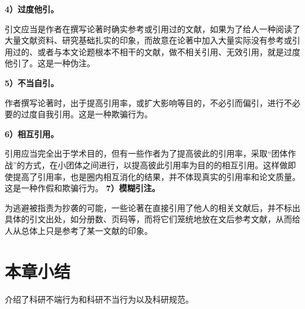 \textbf{4）过度他引。}

引文应当是作者在撰写论著时确实参考或引用过的文献，如果为了给人一种阅读了大量文献资料、研究基础扎实的印象，而故意在论著中加入大量实际没有参考或引用过的、或者与本文论题根本不相干的文献，做不相关引用、无效引用，就是过度他引了。这是一种伪注。

\textbf{5）不当自引。}

作者撰写论著时，出于提高引用率，或扩大影响等目的，不必引而偏引，进行不必要的过度自我引用。这是一种欺骗行为。

\textbf{6）相互引用。}

引用应当完全出于学术目的，但有一些作者为了提高彼此的引用率，采取“团体作战”的方式，在小团体之间进行，以提高彼此引用率为目的的相互引用。这样做即使提高了引用率，也是圈内相互消化的结果，并不体现真实的引用率和论文质量。这是一种作假和欺骗行为。
\newpage %
\textbf{7）模糊引注。}

为逃避被指责为抄袭的可能，一些论著在直接引用了他人的相关文献后，并不标出具体的引文出处，如分册数、页码等，而将它们笼统地放在文后参考文献，从而给人从总体上只是参考了某一文献的印象。

\section{本章小结}
介绍了科研不端行为和科研不当行为以及科研规范。










